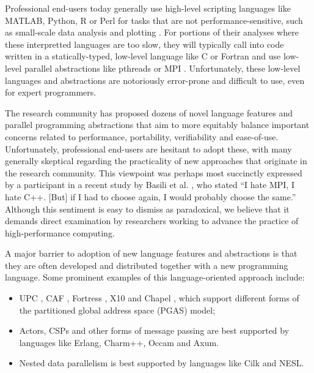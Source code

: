 \documentclass[10pt, conference, compsocconf]{IEEEtran}
\begin{document}
Professional end-users today generally use high-level scripting languages like MATLAB, Python, R or Perl for tasks that are not performance-sensitive, such as small-scale data analysis and plotting \cite{nguyen2010survey}. For portions of their analyses where these interpretted languages are too slow, they will typically call into code written in a statically-typed, low-level language like C or Fortran and use low-level parallel abstractions like pthreads or MPI \cite{4222616,basili2008understanding}. Unfortunately, these low-level languages and abstractions are notoriously error-prone and difficult to use, even for expert programmers.

The research community has proposed dozens of novel language features and parallel programming abstractions that aim to  more equitably balance important concerns related to performance, portability, verifiability and ease-of-use. Unfortunately, professional end-users are hesitant to adopt these, with many generally skeptical regarding the practicality of new approaches that originate in the research community. This viewpoint was perhaps most succinctly expressed by a participant in a recent study by Basili et al. \cite{basili2008understanding}, who stated ``I hate MPI, I hate C++. [But] if I had to choose again, I would probably choose the same.'' Although this sentiment is easy to dismiss as paradoxical, we believe that it demands direct examination by researchers working to advance the practice of high-performance computing. 

A major barrier to adoption of new language features and abstractions is that they are often developed and distributed together with a new programming language. Some prominent examples of this language-oriented approach include:
\begin{itemize}
\item UPC \cite{upc}, CAF \cite{caf}, Fortress \cite{fortress}, X10 \cite{x10} and Chapel \cite{chapel}, which support different forms of the partitioned global address space (PGAS) model; 
\item Actors, CSPs and other forms of message passing are best supported by languages like Erlang, Charm++, Occam and Axum.
\item Nested data parallelism is best supported by languages like Cilk and NESL.
\end{itemize}
\end{document}
